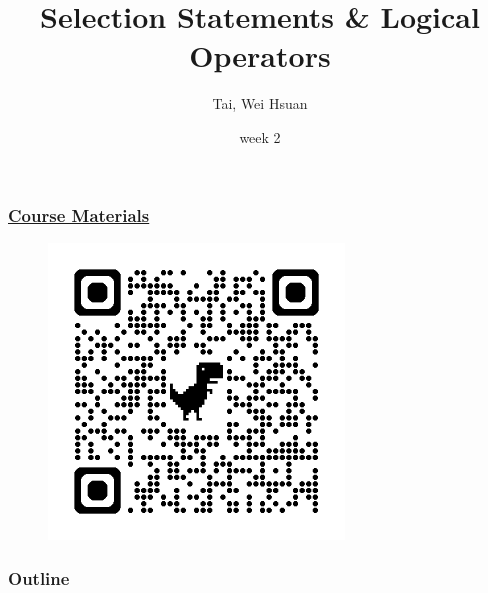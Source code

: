 \documentclass[xcolor=dvipsnames]{beamer}
\title{Selection Statements \& Logical Operators}
\author{Tai, Wei Hsuan}
\date{week 2}
\begin{document}
	\begin{frame}
		\titlepage
	\end{frame}


    \begin{frame}
        \frametitle{\href{https://drive.google.com/drive/folders/14Tkn-rddw0k1obeOxkWi00S43M0e9wlW?usp=sharing}{Course Materials}}
        \begin{figure}
            \centering
            \includegraphics[width=0.7\textwidth]{src/qrcode.png}
        \end{figure}
    \end{frame}

    \begin{frame}
        \frametitle{Outline}
        \tableofcontents
    \end{frame}
\end{document}
